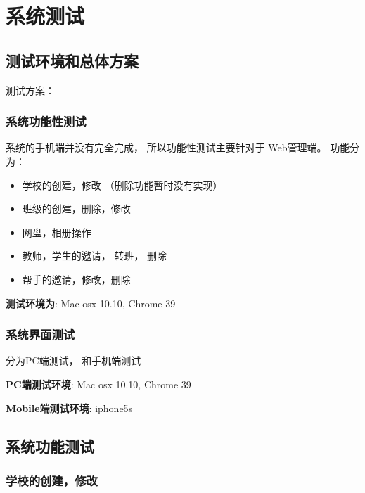 \chapter{系统测试}

\section{测试环境和总体方案}

测试方案：


\subsection{系统功能性测试}
  系统的手机端并没有完全完成， 所以功能性测试主要针对于 Web管理端。 功能分为：

  \begin{itemize}
  \item 学校的创建，修改 （删除功能暂时没有实现）
  \item 班级的创建，删除，修改
  \item 网盘，相册操作
  \item 教师，学生的邀请， 转班， 删除
  \item 帮手的邀请，修改，删除
  \end{itemize}

  \textbf{测试环境为}: Mac osx 10.10, Chrome 39

\subsection{系统界面测试}

  分为PC端测试， 和手机端测试

  \textbf{PC端测试环境}:  Mac osx 10.10, Chrome 39

  \textbf{Mobile端测试环境}: iphone5s








\section{系统功能测试}

\subsection{学校的创建，修改}

